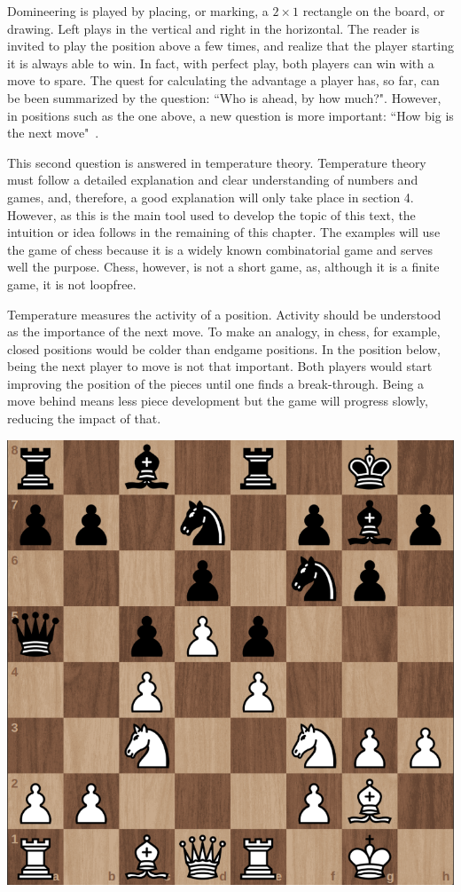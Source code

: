 Domineering is played by placing, or marking, a $2\times1$ rectangle on the board, or drawing. Left plays in the vertical and right in the horizontal. The reader is invited to play the position above a few times, and realize that the player starting it is always able to win. In fact, with perfect play, both players can win with a move to spare. The quest for calculating the advantage a player has, so far, can be been summarized by the question: ``Who is ahead, by how much?". However, in positions such as the one above, a new question is more important: ``How big is the next move"~\cite{6}.

This second question is answered in temperature theory. Temperature theory must follow a detailed explanation and clear understanding of numbers and games, and, therefore, a good explanation will only take place in section 4. However, as this is the main tool used to develop the topic of this text, the intuition or idea follows in the remaining of this chapter. The examples will use the game of chess because it is a widely known combinatorial game and serves well the purpose. Chess, however, is not a short game, as, although it is a finite game, it is not loopfree.

Temperature measures the activity of a position. Activity should be understood as the importance of the next move. To make an analogy, in chess, for example, closed positions would be colder than endgame positions. In the position below, being the next player to move is not that important. Both players would start improving the position of the pieces until one finds a break-through. Being a move behind means less piece development but the game will progress slowly, reducing the impact of that.

\begin{center}
\includegraphics[scale=0.15]{images/chess_cold} 
\end{center}

